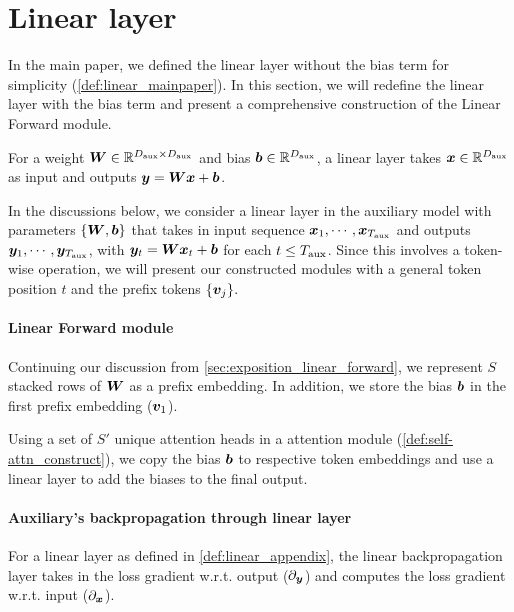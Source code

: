 \section{Linear layer}\label{sec:Linearappendix}
In the main paper, we defined the linear layer without the bias term for simplicity (\cref{def:linear_mainpaper}). In this section, we will redefine the linear layer with the bias term and present a comprehensive construction of the Linear Forward module.

\begin{definition}\label{def:linear_appendix}
    For a weight ${\bm{W}}\in\mathbb{R}^{D_{\text{aux}} \times D_{\text{aux}}}$ and bias ${\bm{b}} \in \mathbb{R}^{ D_{\text{aux}} }$, a linear layer takes ${\bm{x}}\in\mathbb{R}^{D_{\text{aux}}}$ as input and outputs ${\bm{y}} = {\bm{W}}{\bm{x}} + {\bm{b}}$.
\end{definition}

In the discussions below, we consider a linear layer in the auxiliary model with parameters $\{{\bm{W}}, {\bm{b}}\}$ that takes in input sequence ${\bm{x}}_1, \cdots, {\bm{x}}_{T_{\text{aux}}}$ and outputs ${\bm{y}}_1, \cdots, {\bm{y}}_{T_{\text{aux}}}$, with ${\bm{y}}_t = {\bm{W}} {\bm{x}}_t + {\bm{b}}$ for each $t \le T_{\text{aux}}$. Since this involves a token-wise operation, we will present our constructed modules with a general token position $t$ and the prefix tokens $\{{\bm{v}}_j\}.$ 


\paragraph{\simulator{} Linear Forward module} Continuing our discussion from \cref{sec:exposition_linear_forward}, we represent $S$ stacked rows of ${\bm{W}}$ as a prefix embedding. In addition, we store the bias ${\bm{b}}$ in the first prefix embedding (${\bm{v}}_1$).  

Using a set of $S'$ unique attention heads in a \simulator{} attention module (\cref{def:self-attn_construct}), we copy the bias ${\bm{b}}$ to respective token embeddings and use a \simulator{} linear layer to add the biases to the final output.




\paragraph{Auxiliary's backpropagation through linear layer} For a linear layer as defined in \cref{def:linear_appendix}, the linear backpropagation layer takes in the loss gradient w.r.t. output ($\partial_{{\bm{y}}}$) and computes the loss gradient  w.r.t. input ($\partial_{{\bm{x}}}$).


